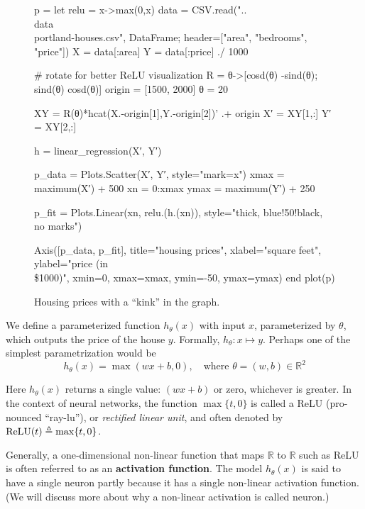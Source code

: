\begin{figure}
    \caption{
        \label{fig:relu} Housing prices with a ``kink'' in the graph.
    }
    \begin{jlcode}
    p = let
        relu = x->max(0,x)
        data = CSV.read("..\\data\\portland-houses.csv", DataFrame; header=["area", "bedrooms", "price"])
        X = data[:area]
        Y = data[:price] ./ 1000

        # rotate for better ReLU visualization
        R = θ->[cosd(θ) -sind(θ); sind(θ) cosd(θ)]
        origin = [1500, 2000]
        θ = 20

        XY = R(θ)*hcat(X.-origin[1],Y.-origin[2])' .+ origin
        X′ = XY[1,:]
        Y′ = XY[2,:]

        h = linear_regression(X′, Y′)

        p_data = Plots.Scatter(X′, Y′, style="mark=x")
        xmax = maximum(X′) + 500
        xn = 0:xmax
        ymax = maximum(Y′) + 250

        p_fit = Plots.Linear(xn, relu.(h.(xn)), style="thick, blue!50!black, no marks")

        Axis([p_data, p_fit], title="housing prices", xlabel="square feet", ylabel="price (in \\\$1000)", xmin=0, xmax=xmax, ymin=-50, ymax=ymax)
    end
    plot(p)
    \end{jlcode}
    \begin{center}
    \end{center}
\end{figure}

We define a parameterized function $h_\theta(x)$ with input $x$, parameterized by
$\theta$, which outputs the price of the house $y$. Formally, $h_\theta : x \mapsto y$. Perhaps %
one of the simplest parametrization would be
\begin{equation}
    h_\theta(x) = \max(wx + b,0), \quad \text{where } \theta = (w,b) \in \mathbb{R}^2
\end{equation}

Here $h_\theta(x)$ returns a single value: $(wx+b)$ or zero, whichever is greater. In
the context of neural networks, the function $\max\{t,0\}$ is called a ReLU (pro-
nounced ``ray-lu''), or \textit{rectified linear unit}, and often denoted by $\operatorname{ReLU}(t) \triangleq
\max\{t,0\}$.

Generally, a one-dimensional non-linear function that maps $\mathbb R$ to $\mathbb R$ such as
ReLU is often referred to as an \textbf{activation function}. The model $h_\theta(x)$ is said
to have a single neuron partly because it has a single non-linear activation
function. (We will discuss more about why a non-linear activation is called
neuron.)


